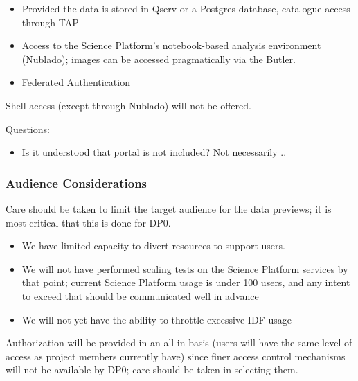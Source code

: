 \begin{itemize}

\item Provided the data is stored in Qserv or a Postgres database, catalogue access through TAP

\item Access to the Science Platform's notebook-based analysis environment (Nublado); images can be accessed pragmatically via the Butler.

\item Federated Authentication

\end{itemize}

Shell access (except through Nublado) will not be offered.

Questions:

\begin{itemize}

\item Is it understood that portal is not included? Not necessarily ..

\end{itemize}


\subsubsection{Audience Considerations}

Care should be taken to limit the target audience for the data previews; it is most critical that this is done for DP0.

\begin{itemize}

\item We have limited capacity to divert resources to support users.

\item We will not have performed scaling tests on the Science Platform services by that point; current Science Platform usage is under 100 users, and any intent to exceed that should be communicated well in advance

\item We will not yet have the ability to throttle excessive IDF usage

\end{itemize}

Authorization will be provided in an all-in basis (users will have the same level of access as project members currently have) since finer access control mechanisms will not be available by DP0; care should be taken in selecting them.

